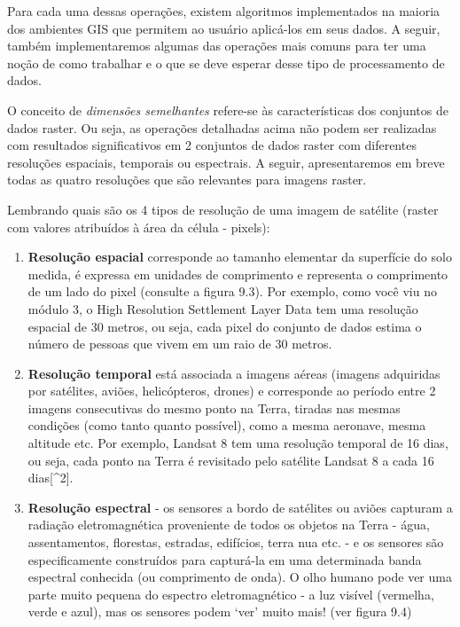 \documentclass[
  portuguese,
]{krantz}
\begin{document}
Para cada uma dessas operações, existem algoritmos implementados na maioria dos ambientes GIS que permitem ao usuário aplicá-los em seus dados. A seguir, também implementaremos algumas das operações mais comuns para ter uma noção de como trabalhar e o que se deve esperar desse tipo de processamento de dados.

O conceito de \emph{dimensões semelhantes} refere-se às características dos conjuntos de dados raster. Ou seja, as operações detalhadas acima não podem ser realizadas com resultados significativos em 2 conjuntos de dados raster com diferentes resoluções espaciais, temporais ou espectrais. A seguir, apresentaremos em breve todas as quatro resoluções que são relevantes para imagens raster.

Lembrando quais são os 4 tipos de resolução de uma imagem de satélite (raster com valores atribuídos à área da célula - pixels):

\begin{enumerate}
\def\labelenumi{\arabic{enumi}.}
\item
  \textbf{Resolução espacial} corresponde ao tamanho elementar da superfície do solo medida, é expressa em unidades de comprimento e representa o comprimento de um lado do pixel (consulte a figura 9.3). Por exemplo, como você viu no módulo 3, o High Resolution Settlement Layer Data tem uma resolução espacial de 30 metros, ou seja, cada pixel do conjunto de dados estima o número de pessoas que vivem em um raio de 30 metros.
\item
  \textbf{Resolução temporal} está associada a imagens aéreas (imagens adquiridas por satélites, aviões, helicópteros, drones) e corresponde ao período entre 2 imagens consecutivas do mesmo ponto na Terra, tiradas nas mesmas condições (como tanto quanto possível), como a mesma aeronave, mesma altitude etc. Por exemplo, Landsat 8 tem uma resolução temporal de 16 dias, ou seja, cada ponto na Terra é revisitado pelo satélite Landsat 8 a cada 16 dias{[}\^{}2{]}.
\item
  \textbf{Resolução espectral} - os sensores a bordo de satélites ou aviões capturam a radiação eletromagnética proveniente de todos os objetos na Terra - água, assentamentos, florestas, estradas, edifícios, terra nua etc. - e os sensores são especificamente construídos para capturá-la em uma determinada banda espectral conhecida (ou comprimento de onda). O olho humano pode ver uma parte muito pequena do espectro eletromagnético - a luz visível (vermelha, verde e azul), mas os sensores podem `ver' muito mais! (ver figura 9.4)
\end{enumerate}
\end{document}
